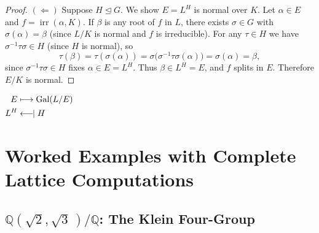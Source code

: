 \documentclass[12pt,a4paper,openany]{book}
\theoremstyle{definition}
\theoremstyle{remark}
\newcommand{\Q}{\mathbb{Q}}
\DeclareMathOperator{\Gal}{Gal}
\DeclareMathOperator{\irr}{irr}
\newcommand{\longmapsfrom}{\longleftarrow\mkern-2mu\mathrel{|}}
\begin{document}
\begin{proof}
\smallskip\noindent
$(\Longleftarrow)$\;
Suppose $H\trianglelefteq G$.  We show $E=L^{H}$ is normal over $K$.
Let $\alpha\in E$ and $f=\irr(\alpha,K)$.  If $\beta$ is any root of $f$
in $L$, there exists $\sigma\in G$ with $\sigma(\alpha)=\beta$ (since $L/K$
is normal and $f$ is irreducible).  For any $\tau\in H$ we have
$\sigma^{-1}\tau\sigma\in H$ (since $H$ is normal), so
\[
  \tau(\beta)=\tau(\sigma(\alpha))
  =\sigma\bigl(\sigma^{-1}\tau\sigma(\alpha)\bigr)
  =\sigma(\alpha)=\beta,
\]
since $\sigma^{-1}\tau\sigma\in H$ fixes $\alpha\in E=L^{H}$.  Thus
$\beta\in L^{H}=E$, and $f$ splits in $E$.  Therefore $E/K$ is normal.
\end{proof}

\begin{center}
\qquad
$\begin{aligned}
  E &\longmapsto \Gal(L/E) \\
  L^{H} &\longmapsfrom H
\end{aligned}$
\label{fig:galois-correspondence}
\end{center}

\section{Worked Examples with Complete Lattice Computations}
\label{sec:ftgt-examples}

\subsection{$\Q(\sqrt{2},\sqrt{3}\,)/\Q$: The Klein Four-Group}
\label{subsec:ex-v4}
\end{document}
